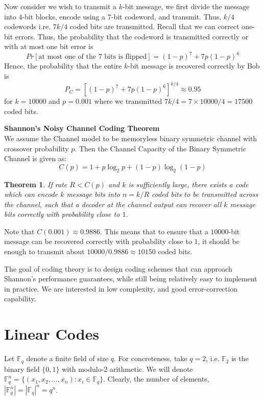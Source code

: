 \documentclass[12pt, oneside]{book}
\newtheorem{theorem}{Theorem}[section]
\theoremstyle{definition}
\theoremstyle{definition}
\theoremstyle{remark}
\begin{document}
Now consider we wish to transmit a $k$-bit message, we first divide the message into $4$-bit blocks, encode using a $7$-bit codeword, and transmit. Thus, $k/4$ codewords i.re. $7k/4$ coded bits are transmitted. Recall that we can correct one-bit errors. Thus, the probability that the codeword is transmitted correctly or with at most one bit error is
\[
Pr[\text{at most one of the $7$ bits is flipped}]=(1-p)^7 + 7p(1-p)^6
\]
Hence, the probability that the entire $k$-bit message is recovered correctly by Bob is
\[
P_C=[(1-p)^7+7p(1-p)^6]^{k/4}\approx 0.95
\]
for $k=10000$ and $p=0.001$ where we transmitted $7k/4=7\times 10000/4=17500$ coded bits.

\begin{importantnote}
    \textbf{Shannon's Noisy Channel Coding Theorem}\\
    We assume the Channel model to be memoryless binary symmetric channel with crossover probability $p$. Then the Channel Capacity of the Binary Symmetric Channel is given as:
    \[
    C(p)=1+p\log_2 p+(1-p)\log_2(1-p)
    \]
    \begin{theorem}
        If rate $R<C(p)$ and $k$ is sufficiently large, there exists a code which can encode $k$ message bits into $n=k/R$ coded bits to be transmitted across the channel, such that a decoder at the channel output can recover all $k$ message bits correctly with probability close to $1$.
    \end{theorem}
    Note that $C(0.001)\approx 0.9886$. This means that to ensure that a $10000$-bit message can be recovered correctly with probability close to $1$, it should be enough to transmit about $10000/0.9886 \approx 10150$ coded bits.
\end{importantnote}

The goal of coding theory is to design coding schemes that can approach Shannon's performance guarantees, while still being relatively easy to implement in practice. We are interested in low complexity, and good error-correction capability.

\section{Linear Codes}
Let $\mathbb{F}_q$ denote a finite field of size $q$. For concreteness, take $q=2$, i.e. $\mathbb{F}_2$ is the binary field $\{0,1\}$ with modulo-2 arithmetic. We will denote $\mathbb{F}_q^n = \{(x_1,x_2,\ldots,x_n): x_i \in \mathbb{F}_q\}$. Clearly, the number of elements, $|\mathbb{F}_q^n|=|\mathbb{F}_q|^n =q^n$.
\end{document}
